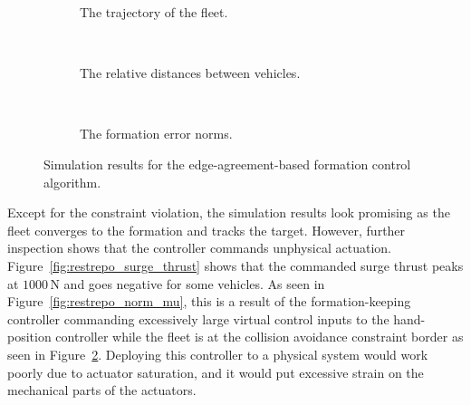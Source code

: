\begin{figure}[htbp]
    \centering
    \begin{subfigure}[t]{.9\textwidth}
    \centering
    \setlength{}
    \setlength\figureheight{5.2 cm}
    
    \vspace*{-2mm}
    \caption{The trajectory of the fleet.}
    \label{fig:restrepo_trajectory}
    \end{subfigure}
    \\
    \begin{subfigure}[t]{.9\textwidth}
    \centering
    \setlength{}
    \setlength\figureheight{2.1cm}
    
    \vspace*{-2mm}
    \caption{The relative distances between vehicles. }
    \label{fig:restrepo_relative_distances}
    \end{subfigure}
    \\
    \begin{subfigure}[t]{.9\textwidth}
    \centering
    \setlength{}
    \setlength\figureheight{2.1cm}
    
    \vspace*{-2mm}
    \caption{The formation error norms.}
    \label{fig:restrepo_formation_error}
    \end{subfigure}
    \vspace*{-2mm}
    \caption{Simulation results for the edge-agreement-based formation control algorithm.}
    \label{fig:sim_results_restrepo}
\end{figure}

Except for the constraint violation, the simulation results look promising as the fleet converges to the formation and tracks the target. However, further inspection shows that the controller commands unphysical actuation. Figure~\ref{fig:restrepo_surge_thrust} shows that the commanded surge thrust peaks at $1000 \, \mathrm{N}$ and goes negative for some vehicles.  As seen in Figure~\ref{fig:restrepo_norm_mu}, this is a result of the formation-keeping controller commanding excessively large virtual control inputs to the hand-position controller while the fleet is at the collision avoidance constraint border as seen in Figure~\ref{fig:restrepo_relative_distances}. Deploying this controller to a physical system would work poorly due to actuator saturation, and it would put excessive strain on the mechanical parts of the actuators.

